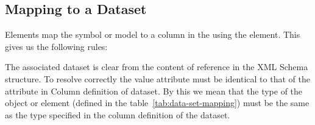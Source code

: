 \subsection{Mapping to a Dataset}

Elements map the symbol or model to a column in the 
using the  element. This gives us the following rules:

\begin{valrules}
   The associated dataset is clear
  from the content of reference in the XML Schema structure. To
  resolve correctly the value  attribute must be identical
  to that of the  attribute in Column definition of
  dataset.
 By this we mean that the type of
the object or element (defined in the table~\ref{tab:data-set-mapping}) must be the same as
the type specified in the column definition of the dataset.
\end{valrules}

